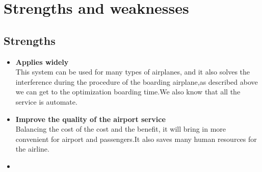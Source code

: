 \documentclass{mcmthesis}
\begin{document}
\section{Strengths and weaknesses}
\lipsum[12]

\subsection{Strengths}
\begin{itemize}
\item \textbf{Applies widely}\\
This  system can be used for many types of airplanes, and it also
solves the interference during  the procedure of the boarding
airplane,as described above we can get to the  optimization
boarding time.We also know that all the service is automate.
\item \textbf{Improve the quality of the airport service}\\
Balancing the cost of the cost and the benefit, it will bring in
more convenient  for airport and passengers.It also saves many
human resources for the airline. \item \textbf{}
\end{itemize}


\end{document}
